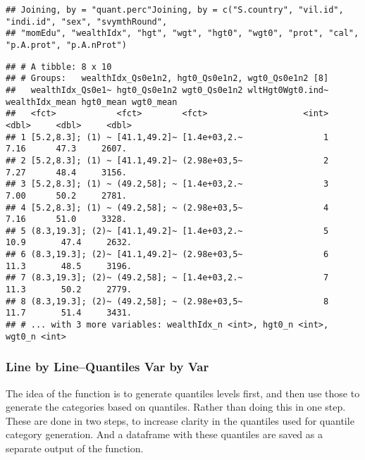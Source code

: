 \documentclass[
]{book}
\newenvironment{Shaded}{\begin{snugshade}}{\end{snugshade}}
\newcommand{\CommentTok}[1]{\textcolor[rgb]{0.56,0.35,0.01}{\textit{#1}}}
\newcommand{\NormalTok}[1]{#1}
\newcommand{\OperatorTok}[1]{\textcolor[rgb]{0.81,0.36,0.00}{\textbf{#1}}}
\begin{document}
\begin{verbatim}
## Joining, by = "quant.perc"Joining, by = c("S.country", "vil.id", "indi.id", "sex", "svymthRound",
## "momEdu", "wealthIdx", "hgt", "wgt", "hgt0", "wgt0", "prot", "cal", "p.A.prot", "p.A.nProt")
\end{verbatim}

\begin{Shaded}
\end{Shaded}

\begin{verbatim}
## # A tibble: 8 x 10
## # Groups:   wealthIdx_Qs0e1n2, hgt0_Qs0e1n2, wgt0_Qs0e1n2 [8]
##   wealthIdx_Qs0e1~ hgt0_Qs0e1n2 wgt0_Qs0e1n2 wltHgt0Wgt0.ind~ wealthIdx_mean hgt0_mean wgt0_mean
##   <fct>            <fct>        <fct>                   <int>          <dbl>     <dbl>     <dbl>
## 1 [5.2,8.3]; (1) ~ [41.1,49.2]~ [1.4e+03,2.~                1           7.16      47.3     2607.
## 2 [5.2,8.3]; (1) ~ [41.1,49.2]~ (2.98e+03,5~                2           7.27      48.4     3156.
## 3 [5.2,8.3]; (1) ~ (49.2,58]; ~ [1.4e+03,2.~                3           7.00      50.2     2781.
## 4 [5.2,8.3]; (1) ~ (49.2,58]; ~ (2.98e+03,5~                4           7.16      51.0     3328.
## 5 (8.3,19.3]; (2)~ [41.1,49.2]~ [1.4e+03,2.~                5          10.9       47.4     2632.
## 6 (8.3,19.3]; (2)~ [41.1,49.2]~ (2.98e+03,5~                6          11.3       48.5     3196.
## 7 (8.3,19.3]; (2)~ (49.2,58]; ~ [1.4e+03,2.~                7          11.3       50.2     2779.
## 8 (8.3,19.3]; (2)~ (49.2,58]; ~ (2.98e+03,5~                8          11.7       51.4     3431.
## # ... with 3 more variables: wealthIdx_n <int>, hgt0_n <int>, wgt0_n <int>
\end{verbatim}

\hypertarget{line-by-linequantiles-var-by-var}{%
\subsubsection{Line by Line--Quantiles Var by Var}\label{line-by-linequantiles-var-by-var}}

The idea of the function is to generate quantiles levels first, and then use those to generate the categories based on quantiles. Rather than doing this in one step. These are done in two steps, to increase clarity in the quantiles used for quantile category generation. And a dataframe with these quantiles are saved as a separate output of the function.
\end{document}
